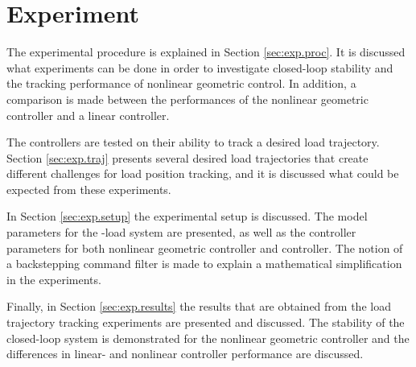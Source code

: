 \chapter{Experiment}\label{ch:exp}
The experimental procedure is explained in Section \ref{sec:exp.proc}. 
It is discussed what experiments can be done in order to investigate closed-loop stability and the tracking performance of nonlinear geometric control.
In addition, a comparison is made between the performances of the nonlinear geometric controller and a linear  controller.

The controllers are tested on their ability to track a desired load trajectory. 
Section \ref{sec:exp.traj} presents several desired load trajectories that create different challenges for load position tracking, and it is discussed what could be expected from these experiments.

%

In Section \ref{sec:exp.setup} the experimental setup is discussed. 
The model parameters for the -load system are presented, as well as the controller parameters for both nonlinear geometric controller and  controller.
The notion of a backstepping command filter is made to explain a mathematical simplification in the experiments.

Finally, in Section \ref{sec:exp.results} the results that are obtained from the load trajectory tracking experiments are presented and discussed.
The stability of the closed-loop system is demonstrated for the nonlinear geometric controller and the differences in linear- and nonlinear controller performance are discussed.

\newpage

